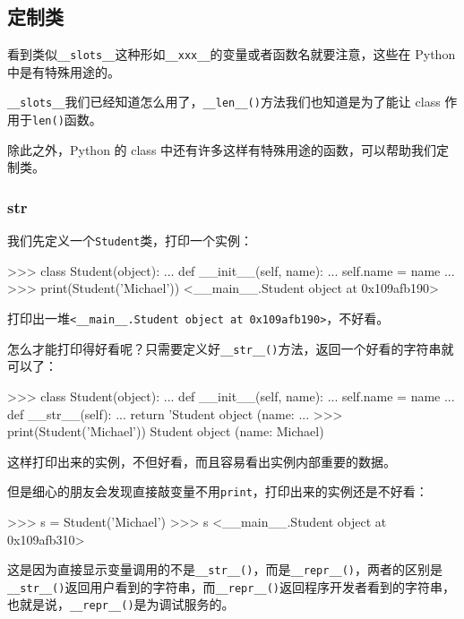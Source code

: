 \hypertarget{ux5b9aux5236ux7c7b}{%
\subsection{定制类}\label{ux5b9aux5236ux7c7b}}

看到类似\texttt{\_\_slots\_\_}这种形如\texttt{\_\_xxx\_\_}的变量或者函数名就要注意，这些在
Python 中是有特殊用途的。

\texttt{\_\_slots\_\_}我们已经知道怎么用了，\texttt{\_\_len\_\_()}方法我们也知道是为了能让
class 作用于\texttt{len()}函数。

除此之外，Python 的 class
中还有许多这样有特殊用途的函数，可以帮助我们定制类。

\hypertarget{str}{%
\subsubsection{\texorpdfstring{\textbf{str}}{str}}\label{str}}

我们先定义一个\texttt{Student}类，打印一个实例：

\begin{pythoncode}
>>> class Student(object):
...     def __init__(self, name):
...         self.name = name
...
>>> print(Student('Michael'))
<__main__.Student object at 0x109afb190>
\end{pythoncode}

打印出一堆\texttt{\textless{}\_\_main\_\_.Student\ object\ at\ 0x109afb190\textgreater{}}，不好看。

怎么才能打印得好看呢？只需要定义好\texttt{\_\_str\_\_()}方法，返回一个好看的字符串就可以了：

\begin{pythoncode}
>>> class Student(object):
...     def __init__(self, name):
...         self.name = name
...     def __str__(self):
...         return 'Student object (name: %
...
>>> print(Student('Michael'))
Student object (name: Michael)
\end{pythoncode}

这样打印出来的实例，不但好看，而且容易看出实例内部重要的数据。

但是细心的朋友会发现直接敲变量不用\texttt{print}，打印出来的实例还是不好看：

\begin{pythoncode}
>>> s = Student('Michael')
>>> s
<__main__.Student object at 0x109afb310>
\end{pythoncode}

这是因为直接显示变量调用的不是\texttt{\_\_str\_\_()}，而是\texttt{\_\_repr\_\_()}，两者的区别是\texttt{\_\_str\_\_()}返回用户看到的字符串，而\texttt{\_\_repr\_\_()}返回程序开发者看到的字符串，也就是说，\texttt{\_\_repr\_\_()}是为调试服务的。

